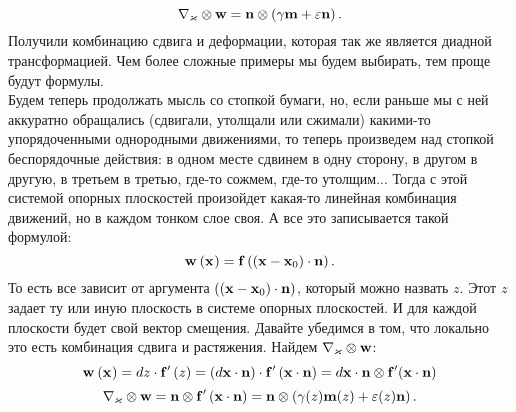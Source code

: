 \documentclass[a4papper, 14pt]{book}
\renewcommand{\epsilon}{\ensuremath{\varepsilon}}
\renewcommand{\kappa}{\ensuremath{\varkappa}}
\newcommand{\diad}{\ensuremath\otimes}
\newcommand{\wx}[3]{\ensuremath\mf{w}_{#3}\left({\mathbf{#1}}_{#2} \right)}
\newcommand{\lf}{\ensuremath \left(}
\newcommand{\ri}{\ensuremath \right)}
\newcommand{\mf}[1]{\ensuremath\mathbf{#1}}
\theoremstyle{plain} %
\theoremstyle{definition} %
\theoremstyle{remark} %
\begin{document}
	\begin{equation}
	\nabla_{\kappa}\diad\mf{w} = \mf{n}\diad\lf\gamma\mf{m}+\epsilon\mf{n}\ri.
	\end{equation}
	Получили комбинацию сдвига и деформации, которая так же является диадной трансформацией.
	Чем более сложные примеры мы будем выбирать, тем проще будут формулы.\\
	Будем теперь продолжать мысль со стопкой бумаги, но, если раньше мы с ней аккуратно обращались (сдвигали, утолщали или сжимали) какими-то упорядоченными однородными движениями, то теперь произведем над стопкой беспорядочные действия: в одном месте сдвинем в одну сторону, в другом в другую, в третьем в третью, где-то сожмем, где-то утолщим... Тогда с этой системой опорных плоскостей произойдет какая-то линейная комбинация движений, но в каждом тонком слое своя. А все это записывается такой формулой:
	\begin{equation}
	\wx{x}{}{} = \mf{f}\lf\lf\mf{x} - \mf{x}_0\ri\cdot\mf{n}\ri. 
	\end{equation}
	То есть все зависит от аргумента $\lf\lf\mf{x} - \mf{x}_0\ri\cdot\mf{n}\ri$, который можно назвать $z$. Этот $z$ задает ту или иную плоскость в системе опорных плоскостей. И для каждой плоскости будет свой вектор смещения. Давайте убедимся в том, что локально это есть комбинация сдвига и растяжения. Найдем $\nabla_{\kappa}\diad\mf{w}$: \\
	\begin{equation}
	\wx{x}{}{} = dz \cdot \mf{f}{^\prime}\left(z\right) = \left(d\mf{x} \cdot \mf{n}\right) \cdot \mf{f}{^\prime} \left(\mf{x} \cdot \mf{n}\right) = d\mf{x} \cdot \mf{n} \diad \mf{f}{^\prime} (\mf{x} \cdot \mf{n})
	\end{equation}
	\begin{equation}
	\nabla_{\kappa}\diad\mf{w} = \mf{n} \diad \mf{f}{^\prime} \left(\mf{x} \cdot \mf{n}\right) = \mf{n} \diad \lf \gamma (z) \mf{m} (z)  + \epsilon (z) \mf{n} \ri.
	\end{equation}
	
\end{document}

